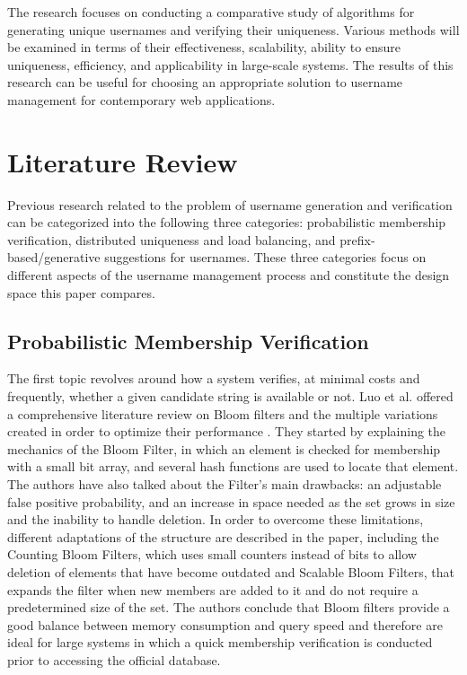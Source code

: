 \documentclass[conference]{IEEEtran}
\begin{document}
The research focuses on conducting a comparative study of algorithms for generating unique usernames and verifying their uniqueness. Various methods will be examined in terms of their effectiveness, scalability, ability to ensure uniqueness, efficiency, and applicability in large-scale systems. The results of this research can be useful for choosing an appropriate solution to username management for contemporary web applications. 

\section{Literature Review}
Previous research related to the problem of username generation and verification can be categorized into the following three categories: probabilistic membership verification, distributed uniqueness and load balancing, and prefix-based/generative suggestions for usernames. These three categories focus on different aspects of the username management process and constitute the design space this paper compares.

\subsection{Probabilistic Membership Verification}
The first topic revolves around how a system verifies, at minimal costs and frequently, whether a given candidate string is available or not. Luo et al. offered a comprehensive literature review on Bloom filters and the multiple variations created in order to optimize their performance \cite{b1}. They started by explaining the mechanics of the Bloom Filter, in which an element is checked for membership with a small bit array, and several hash functions are used to locate that element. The authors have also talked about the Filter's main drawbacks: an adjustable false positive probability, and an increase in space needed as the set grows in size and the inability to handle deletion. In order to overcome these limitations, different
adaptations of the structure are described in the paper, including the
Counting Bloom Filters, which uses small counters instead of bits to allow deletion of elements that have become outdated and Scalable Bloom Filters, that expands the filter when new members are added to it and do not require a predetermined size of the set. The authors conclude that Bloom filters provide a good balance between memory consumption and query speed and therefore are ideal for large systems in which a quick membership verification is conducted prior to accessing the official database.
\end{document}
